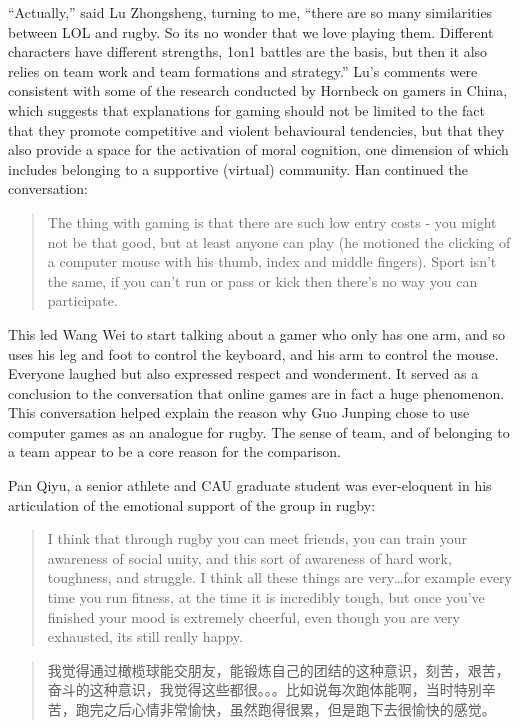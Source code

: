 \begin{CJK}{UTF8}{gbsn}
``Actually,'' said Lu Zhongsheng, turning to me, ``there are so many similarities between LOL and rugby. So its no wonder that we love playing them.  Different characters have different strengths, 1on1 battles are the basis, but then it also relies on team work and team formations and strategy.''  Lu's comments were consistent with some of the research conducted by Hornbeck on gamers in China, which suggests that explanations for gaming should not be limited to the fact that they promote competitive and violent behavioural tendencies, but that they also provide a space for the activation of moral cognition, one dimension of which includes belonging to a supportive (virtual) community. Han continued the conversation:

    \begin{quotation}
          The thing with gaming is that there are such low entry costs - you might not be that good, but at least anyone can play (he motioned the clicking of a computer mouse with his thumb, index and middle fingers).  Sport isn’t the same, if you can’t run or pass or kick then there’s no way you can participate.
    \end{quotation}

This led Wang Wei to start talking about a gamer who only has one arm, and so uses his leg and foot to control the keyboard, and his arm to control the mouse.  Everyone laughed but also expressed respect and wonderment. It served as a conclusion to the conversation that online games are in fact a huge phenomenon.  This conversation helped explain the reason why Guo Junping chose to use computer games as an analogue for rugby.  The sense of team, and of belonging to a team appear to be a core reason for the comparison.

Pan Qiyu, a senior athlete and CAU graduate student was ever-eloquent in his articulation of the emotional support of the group in rugby:

    \begin{quotation}
      I think that through rugby you can meet friends, you can train your awareness of social unity, and this sort of awareness of hard work, toughness, and struggle. I think all these things are very…for example every time you run fitness, at the time it is incredibly tough, but once you’ve finished your mood is extremely cheerful, even though you are very exhausted, its still really happy.
    \end{quotation}

    \begin{quotation}
      我觉得通过橄榄球能交朋友，能锻炼自己的团结的这种意识，刻苦，艰苦，奋斗的这种意识，我觉得这些都很。。。比如说每次跑体能啊，当时特别辛苦，跑完之后心情非常愉快，虽然跑得很累，但是跑下去很愉快的感觉。 
    \end{quotation}


\end{CJK}
